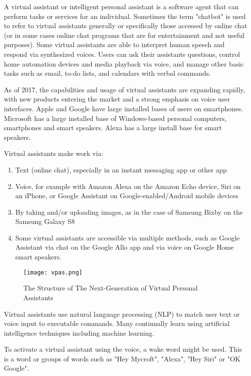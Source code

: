 \documentclass[12pt,a4paper]{article}
\begin{document}
A virtual assistant or intelligent personal assistant is a software agent that can perform tasks or services for an individual. Sometimes the term "chatbot" is used to refer to virtual assistants generally or specifically those accessed by online chat (or in some cases online chat programs that are for entertainment and not useful purposes). Some virtual assistants are able to interpret human speech and respond via synthesized voices. Users can ask their assistants questions, control home automation devices and media playback via voice, and manage other basic tasks such as email, to-do lists, and calendars with verbal commands.

As of 2017, the capabilities and usage of virtual assistants are expanding rapidly, with new products entering the market and a strong emphasis on voice user interfaces. Apple and Google have large installed bases of users on smartphones. Microsoft has a large installed base of Windows-based personal computers, smartphones and smart speakers. Alexa has a large install base for smart speakers.
\par 
Virtual assistants make work via:
\begin{enumerate}
\item Text (online chat), especially in an instant messaging app or other app
\item Voice, for example with Amazon Alexa on the Amazon Echo device, Siri on an iPhone, or Google Assistant on Google-enabled/Android mobile devices
\item By taking and/or uploading images, as in the case of Samsung Bixby on the Samsung Galaxy S8
\item Some virtual assistants are accessible via multiple methods, such as Google Assistant via chat on the Google Allo app and via voice on Google Home smart speakers.
\end{enumerate} 
\par
\begin{figure}[h]
	\centering
	\texttt{[image: vpas.png]}
	\caption{The Structure of The Next-Generation of Virtual Personal Assistants}
\end{figure}

\newpage 

Virtual assistants use natural language processing (NLP) to match user text or voice input to executable commands. Many continually learn using artificial intelligence techniques including machine learning.

To activate a virtual assistant using the voice, a wake word might be used. This is a word or groups of words such as "Hey Mycroft", "Alexa", "Hey Siri" or "OK Google".
\end{document}
